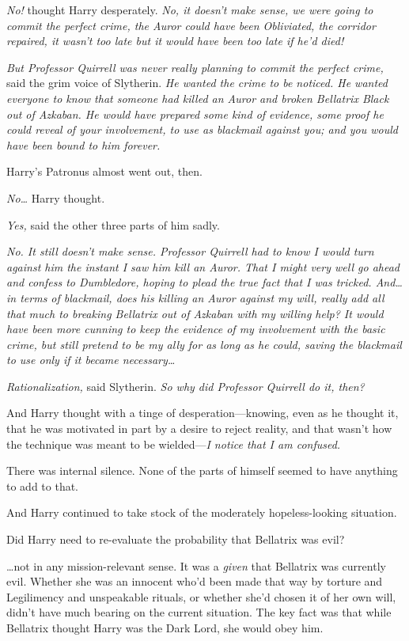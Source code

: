 \emph{No!} thought Harry desperately. \emph{No, it doesn't make sense, we were
going to commit the perfect crime, the Auror could have been Obliviated, the
corridor repaired, it wasn't too late but it \emph{would} have been too late if he'd
died!}

\emph{But Professor Quirrell was never really planning to commit the perfect
crime,} said the grim voice of Slytherin. \emph{He \emph{wanted} the crime to
be noticed. He wanted everyone to know that someone had killed an Auror and
broken Bellatrix Black out of Azkaban. He would have prepared some kind of
evidence, some proof he could reveal of your involvement, to use as blackmail
against you; and you would have been bound to him forever.}

Harry's Patronus almost went out, then.

\emph{No…} Harry thought.

\emph{Yes,} said the other three parts of him sadly.

\emph{No. It still doesn't make sense. Professor Quirrell had to know I would
turn against him the instant I saw him kill an Auror. That I might very well go
ahead and confess to Dumbledore, hoping to plead the true fact that I was
tricked. And…in terms of blackmail, does his killing an Auror against
my will, really add all \emph{that} much to breaking Bellatrix out of Azkaban
with my willing help? It would have been more cunning to keep the evidence of
my involvement with the basic crime, but still pretend to be my ally for as
long as he could, saving the blackmail to use only if it became
necessary…}

\emph{Rationalization,} said Slytherin. \emph{So why \emph{did} Professor
Quirrell do it, then?}

And Harry thought with a tinge of desperation—knowing, even as he thought it,
that he was motivated in part by a desire to reject reality, and that wasn't
how the technique was meant to be wielded—\emph{I notice that I am confused.}

There was internal silence. None of the parts of himself seemed to have
anything to add to that.

And Harry continued to take stock of the moderately hopeless-looking situation.

Did Harry need to re-evaluate the probability that Bellatrix was evil?

…not in any mission-relevant sense. It was a \emph{given} that Bellatrix
was currently evil. Whether she was an innocent who'd been made that way by
torture and Legilimency and unspeakable rituals, or whether she'd chosen it of
her own will, didn't have much bearing on the current situation. The key fact
was that while Bellatrix thought Harry was the Dark Lord, she would obey him.

